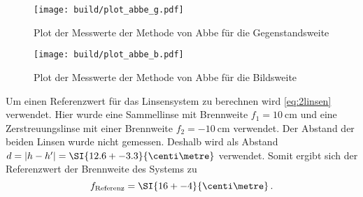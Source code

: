 \begin{figure}
    \centering
    \texttt{[image: build/plot\_abbe\_g.pdf]}
    \caption{Plot der Messwerte der Methode von Abbe für die Gegenstandsweite}
    \label{fig:plot_abbe_g}
\end{figure}

\begin{figure}
    \centering
    \texttt{[image: build/plot\_abbe\_b.pdf]}
    \caption{Plot der Messwerte der Methode von Abbe für die Bildsweite}
    \label{fig:plot_abbe_b}
\end{figure}

Um einen Referenzwert für das Linsensystem zu berechnen wird \autoref{eq:2linsen} verwendet.
Hier wurde eine Sammellinse mit Brennweite $f_1 = \SI{10}{\centi\metre}$ und eine Zerstreuungslinse mit einer Brennweite $f_2 = \SI{-10}{\centi\metre}$ verwendet.
Der Abstand der beiden Linsen wurde nicht gemessen.
Deshalb wird als Abstand $d=|h-h'|=\SI{12.6+-3.3}{\centi\metre}$ verwendet.
Somit ergibt sich der Referenzwert der Brennweite des Systems zu
\begin{equation*}
    f_\text{Referenz} = \SI{16+-4}{\centi\metre} \, .
\end{equation*}